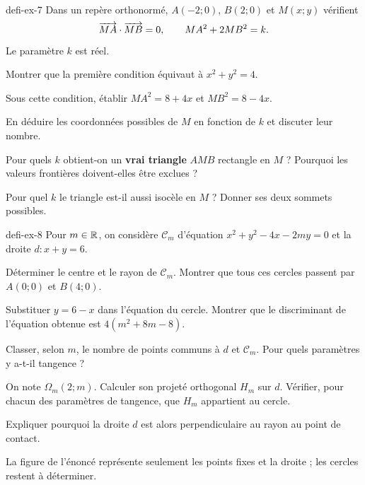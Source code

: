 \begin{blocEdition}{defi-ex-7}
Dans un repère orthonormé, $A(-2;0)$, $B(2;0)$ et $M(x;y)$ vérifient
\[\overrightarrow{MA}\cdot\overrightarrow{MB}=0,\qquad MA^2+2MB^2=k.\]
Le paramètre $k$ est réel.
\begin{questions}
\item Montrer que la première condition équivaut à $x^2+y^2=4$.
\item Sous cette condition, établir $MA^2=8+4x$ et $MB^2=8-4x$.
\item En déduire les coordonnées possibles de $M$ en fonction de $k$ et discuter leur nombre.
\item Pour quels $k$ obtient-on un \textbf{vrai triangle} $AMB$ rectangle en $M$ ?
Pourquoi les valeurs frontières doivent-elles être exclues ?
\item Pour quel $k$ le triangle est-il aussi isocèle en $M$ ? Donner ses deux sommets possibles.
\end{questions}
\label{figedition-defi-ex-7-1}
\end{blocEdition}

\begin{blocEdition}{defi-ex-8}
Pour $m\in\mathbb{R}$, on considère $\mathcal C_m$ d'équation
$x^2+y^2-4x-2my=0$ et la droite $d:x+y=6$.
\begin{questions}
\item Déterminer le centre et le rayon de $\mathcal C_m$. Montrer que tous
ces cercles passent par $A(0;0)$ et $B(4;0)$.
\item Substituer $y=6-x$ dans l'équation du cercle. Montrer que le discriminant
de l'équation obtenue est $4(m^2+8m-8)$.
\item Classer, selon $m$, le nombre de points communs à $d$ et $\mathcal C_m$.
Pour quels paramètres y a-t-il tangence ?
\item On note $\Omega_m(2;m)$. Calculer son projeté orthogonal $H_m$ sur $d$.
Vérifier, pour chacun des paramètres de tangence, que $H_m$ appartient au cercle.
\item Expliquer pourquoi la droite $d$ est alors perpendiculaire au rayon au point de contact.
\end{questions}
La figure de l'énoncé représente seulement les points fixes et la droite ; les cercles restent à déterminer.
\label{figedition-defi-ex-8-1}
\end{blocEdition}

